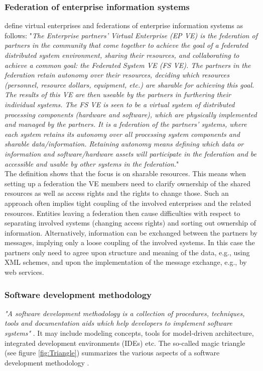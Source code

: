 \subsubsection{\textbf{Federation of enterprise information systems}}
\cite{article:VirtualEnterprise} define virtual enterprises and federations of enterprise information systems as follows: "\textit{The Enterprise partners' Virtual Enterprise (EP VE) is the federation of partners in the community that come together to achieve the goal of a federated distributed system environment, sharing their resources, and collaborating to achieve a common goal: the Federated System VE (FS VE). The partners in the federation retain autonomy over their resources, deciding which resources (personnel, resource dollars, equipment, etc.) are sharable for achieving this goal. The results of this VE are then useable by the partners in furthering their individual systems. The FS VE is seen to be a virtual system of distributed processing components (hardware and software), which are physically implemented and managed by the partners. It is a federation of the partners' systems, where each system retains its autonomy over all processing system components and sharable data/information. Retaining autonomy means defining which data or information and software/hardware assets will participate in the federation and be accessible and usable by other systems in the federation.}"\\
The definition shows that the focus is on sharable resources. This means when setting up a federation the VE members need to clarify ownership of the shared resources as well as access rights and the rights to change those. Such an approach often implies tight coupling of the involved enterprises and the related resources. Entities leaving a federation then cause difficulties with respect to separating involved systems (changing access rights) and sorting out ownership of information.
Alternatively, information can be exchanged between the partners by messages, implying only a loose coupling of the involved systems. In this case the partners only need to agree upon structure and meaning of the data, e.g., using XML schemes, and upon the implementation of the message exchange, e.g., by web services.
\\
\subsubsection{\textbf{Software development methodology}}
\textit{"A software development methodology is a collection of procedures, techniques, tools and documentation aids which help developers to implement software systems"}  \cite{book:ISDevelopment}. It may include modeling concepts, tools for model-driven architecture, integrated development environments (IDEs) etc. The so-called magic triangle (see figure \ref{fig:Triangle}) summarizes the various aspects of a software development methodology \cite{book:SoftEng}.


